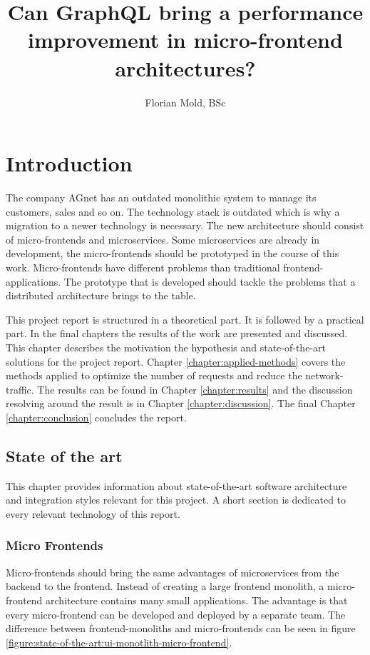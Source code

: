 \documentclass[MSE,Master,english]{twbook}%
\title{Can GraphQL bring a performance improvement in micro-frontend architectures?}
\author{Florian Mold, BSc}
\begin{document}
\maketitle

\chapter{Introduction}\label{chapter:introduction}
 
The company AGnet has an outdated monolithic system to manage its customers, sales and so on. The technology stack is outdated which is why a migration to a newer technology is necessary. The new architecture should consist of micro-frontends and microservices. Some microservices are already in development, the micro-frontends should be prototyped in the course of this work. Micro-frontends have different problems than traditional frontend-applications. The prototype that is developed should tackle the problems that a distributed architecture brings to the table.
 
This project report is structured in a theoretical part. It is followed by a practical part. In the final chapters the results of the work are presented and discussed. This chapter describes the motivation the hypothesis and state-of-the-art solutions for the project report. Chapter \ref{chapter:applied-methods} covers the methods applied to optimize the number of requests and reduce the network-traffic. The results can be found in Chapter \ref{chapter:results} and the discussion resolving around the result is in Chapter \ref{chapter:discussion}. The final Chapter \ref{chapter:conclusion} concludes the report.

\section{State of the art}

This chapter provides information about state-of-the-art software architecture and integration styles relevant for this project. A short section is dedicated to every relevant technology of this report.

\subsection{Micro Frontends}

Micro-frontends should bring the same advantages of microservices from the backend to the frontend. Instead of creating a large frontend monolith, a micro-frontend architecture contains many small applications. The advantage is that every micro-frontend can be developed and deployed by a separate team. \cite{book:2020:geers:micro-frontends-in-action} The difference between frontend-monoliths and micro-frontends can be seen in figure \ref{figure:state-of-the-art:ui-monotlith-micro-frontend}.
\end{document}
